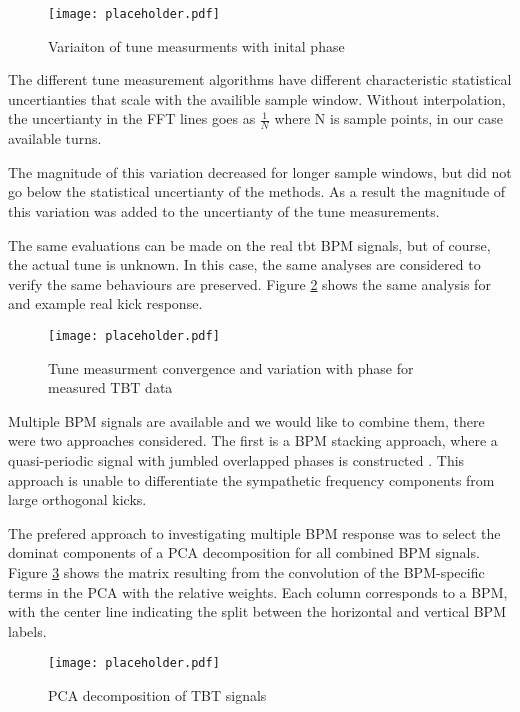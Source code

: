 \begin{figure}
	\centering
	\texttt{[image: placeholder.pdf]}
	\caption{Variaiton of tune measurments with inital phase}
	\label{fig:baseRoll}
\end{figure}

The different tune measurement algorithms have different characteristic statistical uncertianties that scale with the availible sample window. Without interpolation, the uncertianty in the FFT lines goes as $\frac{1}{N}$ where N is sample points, in our case available turns.

The magnitude of this variation decreased for longer sample windows, but did not go below the statistical uncertianty of the methods. As a result the magnitude of this variation was added to the uncertianty of the tune measurements.


The same evaluations can be made on the real tbt BPM signals, but of course, the actual tune is unknown. In this case, the same analyses are considered to verify the same behaviours are preserved. Figure \ref{fig:measConvRoll} shows the same analysis for and example real kick response.

\begin{figure}
	\centering \texttt{[image: placeholder.pdf]}
	\caption{Tune measurment convergence and variation with phase for measured TBT data}
	\label{fig:measConvRoll}
\end{figure}


Multiple BPM signals are available and we would like to combine them, there were two approaches considered. The first is a BPM stacking approach, where a quasi-periodic signal with jumbled overlapped phases is constructed \cite{zisopolous}. This approach is unable to differentiate the sympathetic frequency components from large orthogonal kicks. 

The prefered approach to investigating multiple BPM response was to select the dominat components of a PCA decomposition for all combined BPM signals. Figure \ref{fig:pcaComps} shows the matrix resulting from the convolution of the BPM-specific terms in the PCA with the relative weights. Each column corresponds to a BPM, with the center line indicating the split between the horizontal and vertical BPM labels. 

\begin{figure}
	\centering
	\texttt{[image: placeholder.pdf]}
	\caption{PCA decomposition of TBT signals }
	\label{fig:pcaComps}
\end{figure}

